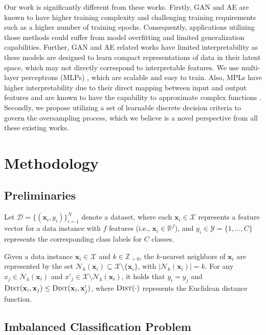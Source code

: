 Our work is significantly different from these works. Firstly, GAN and AE are known to have higher training complexity and challenging training requirements such as a higher number of training epochs.  Consequently, applications utilizing those methods could suffer from model overfitting and limited generalization capabilities. Further, GAN and AE related works have limited interpretability as these models are designed to learn compact representations of data in their latent space, which may not directly correspond to interpretable features.  We use multi-layer perceptrons (MLPs) \cite{murtagh1991multilayer}, which are scalable and easy to train. Also, MPLs have higher interpretability due to their direct mapping between input and output features and are known to have the capability to approximate complex functions \cite{kruse2022multi}. Secondly, we propose utilizing a set of learnable discrete decision criteria to govern the oversampling process, which we believe is a novel perspective from all these existing works.

\section{Methodology} \label{sec:methodology}

\subsection{Preliminaries}

 Let $\mathcal{D} = \{(\mathbf{x}_i, y_i)\}_{i=1}^N$ denote a dataset, where each $\mathbf{x}_i \in \mathcal{X}$ represents a feature vector for a data instance with $f$ features (i.e., $\mathbf{x}_i \in \mathbb{R}^{f}$), and $y_i \in \mathcal{Y} = \{1, \ldots, C\}$ represents the corresponding class labels for $C$ classes. 
 
 Given a data instance $\mathbf{x}_i \in \mathcal{X}$ and $k \in \mathbb{Z}_{> 0}$, the $k$-nearest neighbors of $\mathbf{x}_i$ are represented by the set $\mathcal{N}_k(\mathbf{x}_i) \subseteq \mathcal{X} \setminus \{\mathbf{x}_i\}$, with $|\mathcal{N}_k(\mathbf{x}_i)| = k$. For any $x_j \in \mathcal{N}_k(\mathbf{x}_i)$ and $x'_j \in \mathcal{X} \setminus \mathcal{N}_k(\mathbf{x}_i)$, it holds that $y_i = y_j$ and $\textsc{Dist}(\mathbf{x}_i, \mathbf{x}_j) \leq \textsc{Dist}(\mathbf{x}_i, \mathbf{x}'_j)$, where $\textsc{Dist}(\cdot)$ represents the Euclidean distance function.
 
\subsection{Imbalanced Classification Problem}

